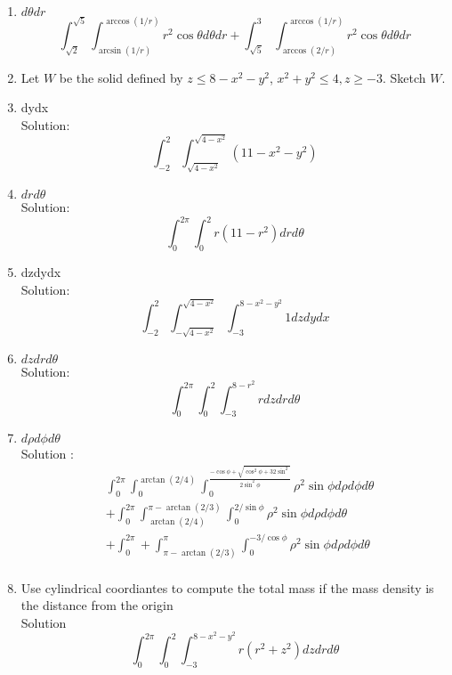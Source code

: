 \documentclass[11pt]{article}
\begin{document}
\begin{enumerate}
  \item $d\theta dr$
        \[\int_{\sqrt{2}}^{\sqrt{5}} \int_{{\arcsin(1/r)}}^{\arccos(1/r)} r^{2}\cos\theta d\theta dr + \int_{\sqrt{5}}^{3} \int_{\arccos(2/r)}^{\arccos(1/r)} r^{2} \cos\theta d\theta dr\]
  \item Let $W$ be the solid defined by $z \le 8-x^{2}-y^{2}$, $x^{2 } + y^{2} \le 4, z \ge -3$. Sketch $W$.
  \item dydx \\
        Solution: \[\int_{-2}^{2} \int_{\sqrt{4-x^{2}}}^{\sqrt{4-x^{2}}} (11-x^{2}-y^{2})\]
  \item $drd\theta$ \\
        Solution: \[\int_{0}^{2\pi} \int_{0}^{2} r(11-r^{2}) drd\theta\]
  \item dzdydx \\
        Solution: \[\int_{-2}^{2}\int_{-\sqrt{4-x^{2}}}^{\sqrt{4-x^{2}}} \int_{-3}^{8-x^{2}-y^{2}} 1 dz dy dx\]
  \item $dzdrd\theta$ \\
        Solution: \[ \int_{0}^{2\pi} \int_{0}^{2} \int_{-3}^{8-r^{2}} r dzdrd\theta\]
  \item $d\rho d\phi d\theta$ \\
        Solution :
\begin{align*}
        &\int_{0}^{2\pi} \int_{0}^{\arctan(2/4)} \int_{0}^{\frac{-\cos\phi + \sqrt{\cos^{2}  \phi + 32\sin^{2}}}{2\sin^{2} \phi}} \rho^{2} \sin\phi d\rho d\phi d\theta\\
        &+ \int_{0}^{2\pi} \int_{\arctan(2/4)}^{\pi - \arctan(2/3)} \int_{{0}}^{2/\sin\phi} \rho^{2} \sin\phi d\rho d\phi d\theta\\
  &+ \int_{0}^{2\pi} + \int_{\pi-\arctan(2/3)}^{\pi} \int_{0}^{-3/\cos\phi} \rho^{2} \sin\phi d\rho d\phi d\theta\\
    \end{align*}
  \item Use cylindrical coordiantes to compute the total mass if the mass density is the distance from the origin \\
        Solution \[\int_{0}^{2\pi} \int_{0}^{2} \int_{-3}^{8-x^{2}-y^{2}} r (r^{2} + z^{2}) dz dr d\theta\]
\end{enumerate}
\end{document}
